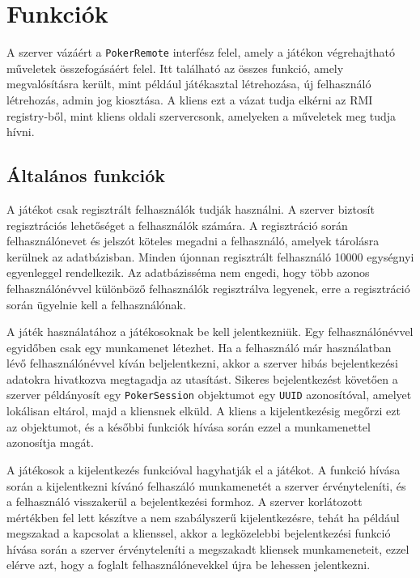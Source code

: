 \section{Funkciók}
A szerver vázáért a \texttt{PokerRemote} interfész felel, amely a játékon végrehajtható műveletek összefogásáért felel. Itt található az összes funkció, amely megvalósításra került, mint például játékasztal létrehozása, új felhasználó létrehozás, admin jog kiosztása. A kliens ezt a vázat tudja elkérni az RMI registry-ből, mint kliens oldali szervercsonk, amelyeken a műveletek meg tudja hívni.
\subsection{Általános funkciók}

A játékot csak regisztrált felhasználók tudják használni. A szerver biztosít regisztrációs lehetőséget a felhasználók számára. A regisztráció során felhasználónevet és jelszót köteles megadni a felhasználó, amelyek tárolásra kerülnek az adatbázisban. Minden újonnan regisztrált felhasználó 10000 egységnyi egyenleggel rendelkezik. Az adatbázisséma nem engedi, hogy több azonos felhasználónévvel különböző felhasználók regisztrálva legyenek, erre a regisztráció során ügyelnie kell a felhasználónak.

A játék használatához a játékosoknak be kell jelentkezniük. Egy felhasználónévvel egyidőben csak egy munkamenet létezhet. Ha a felhasználó már használatban lévő felhasználónévvel kíván beljelentkezni, akkor a szerver hibás bejelentkezési adatokra hivatkozva megtagadja az utasítást. Sikeres bejelentkezést követően a szerver példányosít egy \texttt{PokerSession} objektumot egy \texttt{UUID} \cite{uuid} azonosítóval, amelyet lokálisan eltárol, majd a kliensnek elküld. A kliens a kijelentkezésig megőrzi ezt az objektumot, és a későbbi funkciók hívása során ezzel a munkamenettel azonosítja magát.

A játékosok a kijelentkezés funkcióval hagyhatják el a játékot. A funkció hívása során a kijelentkezni kívánó felhaszáló munkamenetét a szerver érvényteleníti, és a felhasználó visszakerül a bejelentkezési formhoz. A szerver korlátozott mértékben fel lett készítve a nem szabályszerű kijelentkezésre, tehát ha például megszakad a kapcsolat a klienssel, akkor a legközelebbi bejelentkezési funkció hívása során a szerver érvényteleníti a megszakadt kliensek munkameneteit, ezzel elérve azt, hogy a foglalt felhasználónevekkel újra be lehessen jelentkezni.

